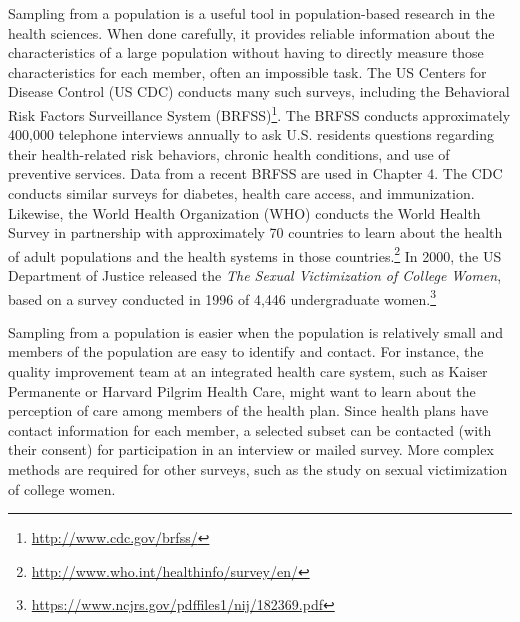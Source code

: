 \begin{doublespace}
Sampling from a population is a useful tool in population-based research in the health sciences.  When done carefully, it provides reliable information about the  characteristics of a large population without having to directly measure those characteristics for each member, often an impossible task.  The US Centers for Disease Control (US CDC) conducts many such surveys, including the Behavioral Risk Factors Surveillance System (BRFSS)\footnote{\url{ http://www.cdc.gov/brfss/}}.  The BRFSS conducts approximately 400,000 telephone interviews annually to ask U.S. residents questions regarding their health-related risk behaviors, chronic health conditions, and use of preventive services.  Data from a recent BRFSS are used in Chapter 4. The CDC conducts similar surveys for diabetes, health care access, and immunization. Likewise, the World Health Organization (WHO) conducts the World Health Survey in partnership  with approximately 70 countries to learn about the health of adult populations and the health systems in those countries.\footnote{\url{http://www.who.int/healthinfo/survey/en/}}  In 2000, the US Department of Justice released the \textit{The Sexual Victimization of College Women}, based on a survey conducted in 1996 of 4,446 undergraduate women.\footnote{\url{https://www.ncjrs.gov/pdffiles1/nij/182369.pdf}}

Sampling from a population is easier when the population is relatively small and members of the population are easy to identify and contact.  For instance, the quality improvement team at an integrated health care system, such as Kaiser Permanente or Harvard Pilgrim Health Care, might want to learn about the perception of care among members of the health plan.  Since health plans have contact information for each member, a selected subset can be contacted (with their consent) for participation in an interview or mailed survey.  More complex methods are required for other surveys, such as the study on sexual victimization of college women. 



\end{doublespace}
